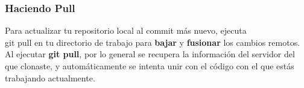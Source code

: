 \begin{frame}[fragile]
    \frametitle{Haciendo Pull}
    Para actualizar tu repositorio local al commit m\'as nuevo, ejecuta\\
    \alert{git pull} en tu directorio de trabajo para \textbf{bajar} y \textbf{fusionar} los cambios remotos. Al ejecutar \textbf{git pull}, por lo general
    se recupera la informaci\'on del servidor del que clonaste, y 
    autom\'aticamente se intenta unir con el c\'odigo con el que est\'as 
    trabajando actualmente.
\end{frame}
